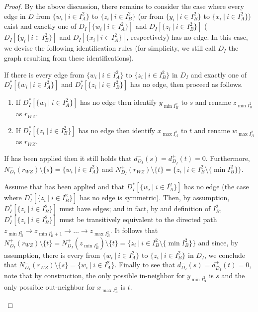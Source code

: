 \begin{proof}
By the above discussion, there remains to consider the case where every edge in $D$ from $\{w_i~|~i \in I_A^2\}$ to $\{z_i~|~i \in I_B^2\}$ (or from $\{y_i~|~i\in I_B^2\}$ to $\{x_i~|~i \in I_A^2\}$) exist and exactly one of $D_I[\{w_i~|~i \in I_A^2\}]$ and $D_I[\{z_i~|~i \in I_B^2\}]$ ($D_I[\{y_i~|~i\in I_B^2\}]$ and $D_I[\{x_i~|~i \in I_A^2\}]$, respectively) has no edge. In this case, we devise the following identification rules (for simplicity, we still call $D_I$ the graph resulting from these identifications).

\begin{identification rule}
\label{rr:WZ}
If there is every edge from $\{w_i~|~i \in I_A^2\}$ to $\{z_i~|~i \in I_B^2\}$ in $D_I$ 
and exactly one of $D_I^*[\{w_i~|~i \in I_A^2\}]$ and $D_I^*[\{z_i~|~i \in I_B^2\}]$ has no edge, then proceed as follows.
\begin{enumerate}[nosep]
\item If $D_I^*[\{w_i~|~i \in I_A^2\}]$ has no edge then identify $y_{\min I_B^2}$ to $s$ and
rename $z_{\min I_B^2}$ as $r_{WZ}$.
\item If $D_I^*[\{z_i~|~i \in I_B^2\}]$ has no edge then identify $x_{\max I_A^2}$ to $t$ and
rename $w_{\max I_A^2}$ as $r_{WZ}$.
\end{enumerate}
\end{identification rule}

\begin{claim}
\label{clm:renamingWZ}
If  has been applied then it still holds that $d^-_{D_I}(s) = d^+_{D_I}(t) = 0$.
Furthermore, $N^-_{D_I}(r_{WZ}) \setminus \{s\} = \{w_i~|~i \in I_A^2\}$ and $N^+_{D_I}(r_{WZ}) \setminus \{t\} = \{z_i~|~i \in I_B^2 \setminus \{\min I_B^2\}\}$.
\end{claim}

\begin{claimproof}
Assume that  has been applied and that $D_I^*[\{w_i~|~i \in I_A^2\}]$ has no edge (the case where $D_I^*[\{z_i~|~i \in I_B^2\}]$ has no edge is symmetric).
Then, by assumption, $D_I^*[\{z_i~|~i \in I_B^2\}]$ must have edges;
and in fact, by  and definition of $I_B^2$, 
$D_I^*[\{z_i~|~i \in I_B^2\}]$ must be transitively equivalent to the directed path 
$z_{\min I_B^2} \rightarrow z_{\min I_B^2 +1} \rightarrow \ldots \rightarrow z_{\max I_B^2}$.
It follows that $N^+_{D_I}(r_{WZ}) \setminus \{t\} = N^+_{D_I}(z_{\min I_B^2}) \setminus \{t\} = \{z_i~|~i \in I_B^2 \setminus \{\min I_B^2\}\}$
and since, by assumption, there is every from $\{w_i~|~i \in I_A^2\}$ to $\{z_i~|~i \in I_B^2\}$ in $D_I$,
we conclude that $N^-_{D_I}(r_{WZ}) \setminus \{s\} = \{w_i~|~i \in I_A^2\}$.
Finally to see that $d^-_{D_I}(s) = d^+_{D_I}(t) = 0$, note that by construction, the only possible in-neighbor for $y_{\min I_B^2}$ is $s$ and the only possible out-neighbor for $x_{\max I_A^2}$ is $t$.
\end{claimproof}


\end{proof}
